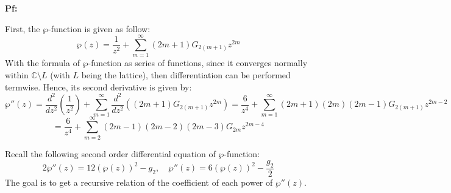 \documentclass{article}
\begin{document}
\textbf{Pf:}

First, the $\wp$-function is given as follow:
$$\wp(z)=\frac{1}{z^2}+\sum_{m=1}^{\infty}(2m+1)G_{2(m+1)}z^{2m}$$
With the formula of $\wp$-function as series of functions, since it converges normally within $\mathbb{C}\setminus L$ (with $L$ being the lattice),
then differentiation can be performed termwise. Hence, its second derivative is given by:
$$\wp''(z)=\frac{d^2}{dz^2}\left(\frac{1}{z^2}\right)+\sum_{m=1}^{\infty}\frac{d^2}{dz^2}\left((2m+1)G_{2(m+1)}z^{2m}\right) = \frac{6}{z^4}+\sum_{m=1}^{\infty}(2m+1)(2m)(2m-1)G_{2(m+1)}z^{2m-2}$$
$$= \frac{6}{z^4}+\sum_{m=2}^{\infty}(2m-1)(2m-2)(2m-3)G_{2m}z^{2m-4}$$

Recall the following second order differential equation of $\wp$-function:
$$2\wp''(z)=12(\wp(z))^2-g_2,\quad \wp''(z)=6(\wp(z))^2-\frac{g_2}{2}$$
The goal is to get a recursive relation of the coefficient of each power of $\wp''(z)$.

\hfil
\end{document}
